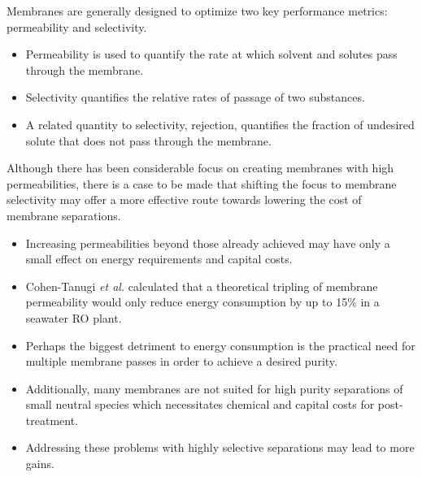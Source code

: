   Membranes are generally designed to optimize two key performance metrics: 
  permeability and selectivity.~\cite{geise_water_2011}
  \begin{itemize}
    \item Permeability is used to quantify the rate at which solvent and solutes
    pass through the membrane.
    \item Selectivity quantifies the relative rates of passage of two substances.
    \item A related quantity to selectivity, rejection, quantifies the fraction
    of undesired solute that does not pass through the membrane.
  \end{itemize}
  
  Although there has been considerable focus on creating membranes with high
  permeabilities, there is a case to be made that shifting the focus to membrane
  selectivity may offer a more effective route towards lowering the cost of 
  membrane separations.~\cite{werber_materials_2016}
  \begin{itemize}
    \item Increasing permeabilities beyond those already achieved may have 
    only a small effect on energy requirements and capital costs. 
    \item Cohen-Tanugi \textit{et al.} calculated that a theoretical tripling of membrane permeability
    would only reduce energy consumption by up to 15\% in a seawater RO plant.~\cite{cohen-tanugi_quantifying_2014}
    \item Perhaps the biggest detriment to energy consumption is the practical
	need for multiple membrane passes in order to achieve a desired purity.~\cite{singh_production_2009}
    \item Additionally, many membranes are not suited for high purity separations
    of small neutral species which necessitates chemical and capital costs for
    post-treatment.~\cite{shannon_science_2009,fritzmann_state---art_2007}
    \item Addressing these problems with highly selective separations may lead to 
    more gains.~\cite{deshmukh_desalination_2015}
 \end{itemize} 
  
